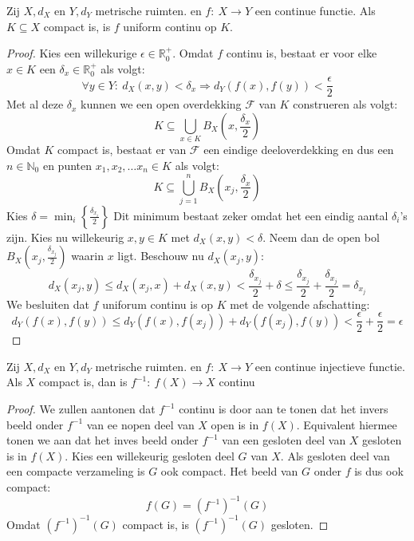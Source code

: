 \documentclass[main.tex]{subfiles}
\begin{document}
\begin{bst}
  Zij $X,d_{X}$ en $Y,d_{Y}$ metrische ruimten. en $f:\ X \rightarrow Y$ een continue functie.
  Als $K \subseteq X$ compact is, is $f$ uniform continu op $K$.

  \begin{proof}
    Kies een willekurige $\epsilon \in \mathbb{R}_{0}^{+}$.
    Omdat $f$ continu is, bestaat er voor elke $x\in K$ een $\delta_{x} \in \mathbb{R}_{0}^{+}$ als volgt: 
    \[ \forall y\in Y:\ d_{X}(x,y) < \delta_{x} \Rightarrow d_{Y}\left(f(x),f(y)\right) < \frac{\epsilon}{2} \]
    Met al deze $\delta_{x}$ kunnen we een open overdekking $\mathcal{F}$ van $K$ construeren als volgt:
    \[ K \subseteq \bigcup_{x\in K}B_{X}\left(x,\frac{\delta_{x}}{2}\right) \]
    Omdat $K$ compact is, bestaat er van $\mathcal{F}$ een eindige deeloverdekking en dus een $n\in \mathbb{N}_{0}$ en punten $x_{1},x_{2},\dotsc x_{n}\in K$ als volgt:
    \[ K \subseteq \bigcup_{j=1}^{n}B_{X}\left(x_{j},\frac{\delta_{x}}{2}\right) \]
    Kies $\delta = \min_{i}\left\{\frac{\delta_{x_{i}}}{2} \right\}$
    Dit minimum bestaat zeker omdat het een eindig aantal $\delta_{i}$'s zijn.
    Kies nu willekeurig $x,y\in K$ met $d_{X}(x,y) < \delta$.
    Neem dan de open bol $B_{X}\left(x_{j},\frac{\delta_{x_{j}}}{2}\right)$ waarin $x$ ligt.
    Beschouw nu $d_{X}(x_{j},y)$:
    \[ d_{X}(x_{j},y) \le d_{X}(x_{j},x) + d_{X}(x,y) < \frac{\delta_{x_{j}}}{2} + \delta \le \frac{\delta_{x_{j}}}{2} + \frac{\delta_{x_{j}}}{2} = \delta_{x_{j}} \]
    We besluiten dat $f$ uniforum continu is op $K$ met de volgende afschatting:
    \[ d_{Y}(f(x),f(y)) \le d_{Y}(f(x),f(x_{j})) + d_{Y}(f(x_{j}),f(y)) < \frac{\epsilon}{2} + \frac{\epsilon}{2} = \epsilon \]
  \end{proof}
\end{bst}

\begin{bst}

  Zij $X,d_{X}$ en $Y,d_{Y}$ metrische ruimten. en $f:\ X \rightarrow Y$ een continue injectieve functie.
  Als $X$ compact is, dan is $f^{-1}:\ f(X) \rightarrow X$ continu

  \begin{proof}
    We zullen aantonen dat $f^{-1}$ continu is door aan te tonen dat het invers beeld onder $f^{-1}$ van ee nopen deel van $X$ open is in $f(X)$.
    Equivalent hiermee tonen we aan dat het inves beeld onder $f^{-1}$ van een gesloten deel van $X$ gesloten is in $f(X)$.
    Kies een willekeurig gesloten deel $G$ van $X$.
    Als gesloten deel van een compacte verzameling is $G$ ook compact.
    Het beeld van $G$ onder $f$ is dus ook compact:
    \[ f(G) = \left(f^{-1}\right)^{-1}(G) \]
    Omdat $\left(f^{-1}\right)^{-1}(G)$ compact is, is $\left(f^{-1}\right)^{-1}(G)$ gesloten.
  \end{proof}
\end{bst}
\end{document}
